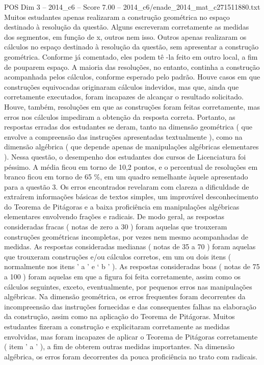 \begin{textsample}{POS Dim 3 – 2014\_c6 – Score 7.00 – 2014\_c6/enade\_2014\_mat\_c271511880.txt}
Muitos estudantes apenas realizaram a construção geométrica no espaço destinado à resolução da questão.
Alguns escreveram corretamente as medidas dos segmentos, em função de x, outros nem isso.
Outros apenas realizaram os cálculos no espaço destinado à resolução da questão, sem apresentar a construção geométrica.
Conforme já comentado, eles podem tê -la feito em outro local, a fim de pouparem espaço.
A maioria das resoluções, no entanto, continha a construção acompanhada pelos cálculos, conforme esperado pelo padrão.
Houve casos em que construções equivocadas originaram cálculos indevidos, mas que, ainda que corretamente executados, foram incapazes de alcançar o resultado solicitado.
Houve, também, resoluções em que as construções foram feitas corretamente, mas erros nos cálculos impediram a obtenção da resposta correta.
Portanto, as respostas erradas dos estudantes se deram, tanto na dimensão geométrica ( que envolve a compreensão das instruções apresentadas textualmente ), como na dimensão algébrica ( que depende apenas de manipulações algébricas elementares ).
Nessa questão, o desempenho dos estudantes dos cursos de Licenciatura foi péssimo.
A média ficou em torno de 10,2 pontos, e o percentual de resoluções em branco ficou em torno de 65 \%, em um quadro semelhante àquele apresentado para a questão 3.
Os erros encontrados revelaram com clareza a dificuldade de extraírem informações básicas de textos simples, um improvável desconhecimento do Teorema de Pitágoras e a baixa proficiência em manipulações algébricas elementares envolvendo frações e radicais.
De modo geral, as respostas consideradas fracas ( notas de zero a 30 ) foram aquelas que trouxeram construções geométricas incompletas, por vezes nem mesmo acompanhadas de medidas.
As respostas consideradas medianas ( notas de 35 a 70 ) foram aquelas que trouxeram construções e/ou cálculos corretos, em um ou dois itens ( normalmente nos itens ’ a ’ e ‘ b ’ ).
As respostas consideradas boas ( notas de 75 a 100 ) foram aquelas em que a figura foi feita corretamente, assim como os cálculos seguintes, exceto, eventualmente, por pequenos erros nas manipulações algébricas.
Na dimensão geométrica, os erros frequentes foram decorrentes da incompreensão das instruções fornecidas e das consequentes falhas na elaboração da construção, assim como na aplicação do Teorema de Pitágoras.
Muitos estudantes fizeram a construção e explicitaram corretamente as medidas envolvidas, mas foram incapazes de aplicar o Teorema de Pitágoras corretamente ( item ’ a ’ ), a fim de obterem outras medidas importantes.
Na dimensão algébrica, os erros foram decorrentes da pouca proficiência no trato com radicais.

\end{textsample}
